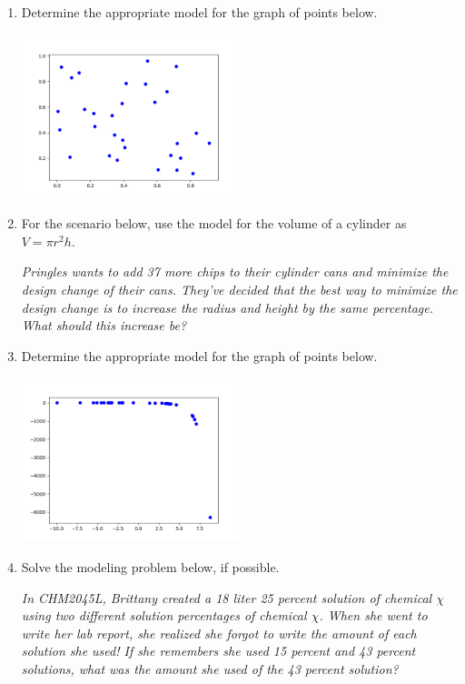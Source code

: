 \documentclass[14pt]{extbook}
\begin{document}
\begin{enumerate}
{\begin{center}
\end{center}
} \newpage
\item{
Determine the appropriate model for the graph of points below.
\begin{center}
    \includegraphics[width=0.5\textwidth]{../Figures/identifyModelGraph12CopyC.png}
\end{center}
} \newpage
\item{
For the scenario below, use the model for the volume of a cylinder as $V = \pi r^2 h$.
\begin{center}
    \textit{ Pringles wants to add 37  more chips to their cylinder cans and minimize the design change of their cans. They've decided that the best way to minimize the design change is to increase the radius and height by the same percentage. What should this increase be? }
\end{center}
} \newpage
\item{
Determine the appropriate model for the graph of points below.
\begin{center}
    \includegraphics[width=0.5\textwidth]{../Figures/identifyModelGraph12C.png}
\end{center}
} \newpage
\item{
Solve the modeling problem below, if possible.
\begin{center}
    \textit{ In CHM2045L, Brittany created a 18 liter 25 percent solution of chemical $\chi$ using two different solution percentages of chemical $\chi$. When she went to write her lab report, she realized she forgot to write the amount of each solution she used! If she remembers she used 15 percent and 43 percent solutions, what was the amount she used of the 43 percent solution? }

\end{center}}
\end{enumerate}
\end{document}
